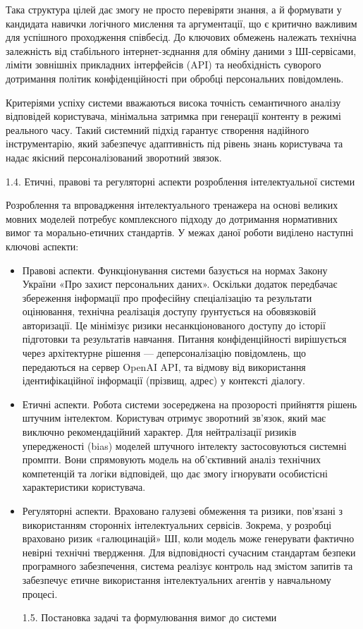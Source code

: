 \documentclass[
]{article}
\begin{document}
Така структура цілей дає змогу не просто перевіряти знання, а й
формувати у кандидата навички логічного мислення та аргументації, що є
критично важливим для успішного проходження співбесід. До ключових
обмежень належать технічна залежність від стабільного
інтернет-з\textquotesingle єднання для обміну даними з ШІ-сервісами,
ліміти зовнішніх прикладних інтерфейсів (API) та необхідність суворого
дотримання політик конфіденційності при обробці персональних
повідомлень.

Критеріями успіху системи вважаються висока точність семантичного
аналізу відповідей користувача, мінімальна затримка при генерації
контенту в режимі реального часу. Такий системний підхід гарантує
створення надійного інструментарію, який забезпечує адаптивність під
рівень знань користувача та надає якісний персоналізований зворотний
зв\textquotesingle язок.

\protect{}\label{_Toc228981055}{}1.4. Етичні, правові та
регуляторні аспекти розроблення інтелектуальної системи

Розроблення та впровадження інтелектуального тренажера на основі великих
мовних моделей потребує комплексного підходу до дотримання нормативних
вимог та морально-етичних стандартів. У межах даної роботи виділено
наступні ключові аспекти:

\begin{itemize}
\item
  Правові аспекти. Функціонування системи базується на нормах Закону
  України «Про захист персональних даних». Оскільки додаток передбачає
  збереження інформації про професійну спеціалізацію та результати
  оцінювання, технічна реалізація доступу ґрунтується на
  обов\textquotesingle язковій авторизації. Це мінімізує ризики
  несанкціонованого доступу до історії підготовки та результатів
  навчання. Питання конфіденційності вирішується через архітектурне
  рішення --- деперсоналізацію повідомлень, що передаються на сервер
  OpenAI API, та відмову від використання ідентифікаційної інформації
  (прізвищ, адрес) у контексті діалогу.
\item
  Етичні аспекти. Робота системи зосереджена на прозорості прийняття
  рішень штучним інтелектом. Користувач отримує зворотний зв'язок, який
  має виключно рекомендаційний характер. Для нейтралізації ризиків
  упередженості (bias) моделей штучного інтелекту застосовуються
  системні промпти. Вони спрямовують модель на об'єктивний аналіз
  технічних компетенцій та логіки відповідей, що дає змогу ігнорувати
  особистісні характеристики користувача.
\item
  Регуляторні аспекти. Враховано галузеві обмеження та ризики, пов'язані
  з використанням сторонніх інтелектуальних сервісів. Зокрема, у
  розробці враховано ризик «галюцинацій» ШІ, коли модель може генерувати
  фактично невірні технічні твердження. Для відповідності сучасним
  стандартам безпеки програмного забезпечення, система реалізує контроль
  над змістом запитів та забезпечує етичне використання інтелектуальних
  агентів у навчальному процесі.

  \protect{}\label{_Toc228981056}{}1.5. Постановка задачі
  та формулювання вимог до системи
\end{itemize}
\end{document}
